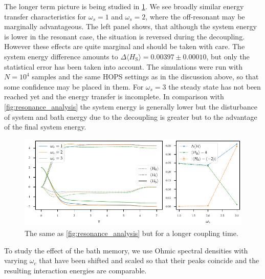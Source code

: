 The longer term picture is being studied in
\cref{fig:resonance_analysis_steady}. We see broadly similar energy
transfer characteristics for \(ω_{s}=1\) and \(ω_{s}=2\), where the
off-resonant may be marginally advantageous. The left panel shows,
that although the system energy is lower in the resonant case, the
situation is reversed during the decoupling. However these effects are
quite marginal and should be taken with care. The system energy
difference amounts to
\(\Delta\langle H_\mathrm{S}\rangle=0.00397\pm 0.00010\), but only the
statistical error has been taken into account. The simulations were
run with \(N=10^{4}\) samples and the same HOPS settings as in the
discussion above, so that some confidence may be placed in them. For
\(ω_{s}=3\) the steady state has not been reached yet and the energy
transfer is incomplete. In comparison with
\cref{fig:resonance_analysis} the system energy is generally lower but
the disturbance of system and bath energy due to the decoupling is
greater but to the advantage of the final system energy.
\begin{figure}[h]
  \centering
  \includegraphics{figs/one_bath_syst/resonance_analysis_steady}
  \caption{\label{fig:resonance_analysis_steady} The same as
    \cref{fig:resonance_analysis} but for a longer coupling time.}
\end{figure}

To study the effect of the bath memory, we use Ohmic spectral
densities with varying \(ω_c\) that have been shifted and scaled so
that their peaks coincide and the resulting interaction energies are
comparable.

